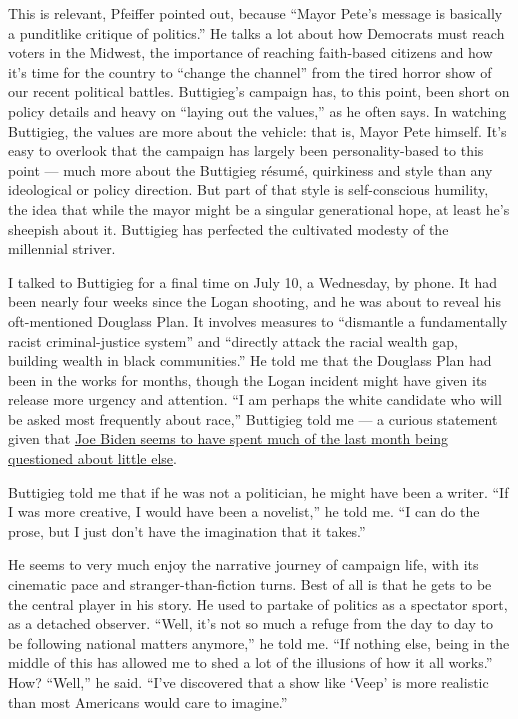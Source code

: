 This is relevant, Pfeiffer pointed out, because ``Mayor Pete's message
is basically a punditlike critique of politics.'' He talks a lot about
how Democrats must reach voters in the Midwest, the importance of
reaching faith-based citizens and how it's time for the country to
``change the channel'' from the tired horror show of our recent
political battles. Buttigieg's campaign has, to this point, been short
on policy details and heavy on ``laying out the values,'' as he often
says. In watching Buttigieg, the values are more about the vehicle: that
is, Mayor Pete himself. It's easy to overlook that the campaign has
largely been personality-based to this point --- much more about the
Buttigieg résumé, quirkiness and style than any ideological or policy
direction. But part of that style is self-conscious humility, the idea
that while the mayor might be a singular generational hope, at least
he's sheepish about it. Buttigieg has perfected the cultivated modesty
of the millennial striver.

I talked to Buttigieg for a final time on July 10, a Wednesday, by
phone. It had been nearly four weeks since the Logan shooting, and he
was about to reveal his oft-mentioned Douglass Plan. It involves
measures to ``dismantle a fundamentally racist criminal-justice system''
and ``directly attack the racial wealth gap, building wealth in black
communities.'' He told me that the Douglass Plan had been in the works
for months, though the Logan incident might have given its release more
urgency and attention. ``I am perhaps the white candidate who will be
asked most frequently about race,'' Buttigieg told me --- a curious
statement given that
\href{https://www.nytimes3xbfgragh.onion/2019/07/15/us/politics/biden-busing.html}{Joe
Biden seems to have spent much of the last month being questioned about
little else}.

Buttigieg told me that if he was not a politician, he might have been a
writer. ``If I was more creative, I would have been a novelist,'' he
told me. ``I can do the prose, but I just don't have the imagination
that it takes.''

He seems to very much enjoy the narrative journey of campaign life, with
its cinematic pace and stranger-than-fiction turns. Best of all is that
he gets to be the central player in his story. He used to partake of
politics as a spectator sport, as a detached observer. ``Well, it's not
so much a refuge from the day to day to be following national matters
anymore,'' he told me. ``If nothing else, being in the middle of this
has allowed me to shed a lot of the illusions of how it all works.''
How? ``Well,'' he said. ``I've discovered that a show like `Veep' is
more realistic than most Americans would care to imagine.''


